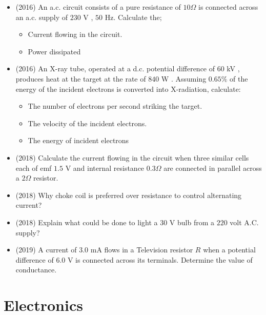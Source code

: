 \documentclass{article}
\begin{document}
\begin{itemize}
\item (2016)  An a.c. circuit consists of a pure resistance of $ 10\Omega $ is connected across an a.c. supply of $ 230$ V , $ 50$ Hz.  Calculate the;\begin{itemize}
\item Current flowing in the circuit.
\item Power dissipated
\end{itemize}
\item (2016)  An X-ray tube, operated at a d.c. potential difference of $ 60$ kV , produces heat at the target at the rate of $ 840$ W .  Assuming $ 0.65\%$ of the energy of the incident electrons is converted into X-radiation, calculate:\begin{itemize}
\item The number of electrons per second striking the target.
\item The velocity of the incident electrons.
\item The energy of incident electrons
\end{itemize}
\item (2018)  Calculate the current flowing in the circuit when three similar cells each of emf $ 1.5$ V and internal resistance $ 0.3\Omega $ are connected in parallel across a $ 2\Omega $ resistor. 
\item (2018)  Why choke coil is preferred over resistance to control alternating current?
\item (2018)  Explain what could be done to light a $ 30$ V bulb from a $ 220$ volt A.C. supply?
\item (2019)  A current of $ 3.0$ mA flows in a Television resistor $ R$ when a potential difference of $ 6.0$ V is connected across its terminals. Determine the value of conductance.
\end{itemize}


\section{Electronics}
\end{document}
